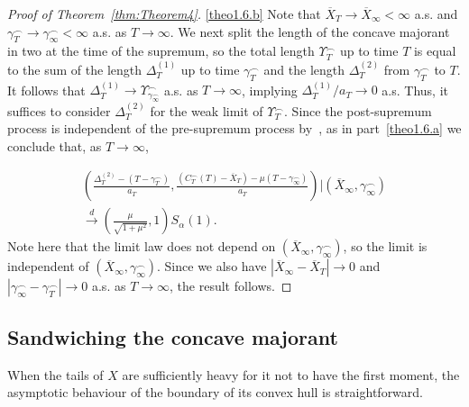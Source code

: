 \documentclass[10pt]{amsart}
\theoremstyle{definition}\newtheorem{defi}[theo]{Definition}\newtheorem{rema}[theo]{Remark}\newtheorem{exam}[theo]{Example}\newtheorem{exem}[theo]{Example}\newtheorem{nota}[theo]{Notation}
\newcommand\1{\mathds{1}}
\newcommand\cid{\xrightarrow{d}}
\newcommand\ov[1]{\overline{#1}}
\begin{document}
\begin{proof}[Proof of Theorem~\ref{thm:Theorem4}]
\eqref{theo1.6.b} Note that $\ov{X}_T\to\ov{X}_\infty <\infty$ a.s. and $\gamma_T^\frown\to\gamma_\infty^\frown<\infty$ a.s. as $T\to\infty$. We next split the length of the concave majorant in two at the time of the supremum, so the total length $\Upsilon_T^\frown$ up to time $T$ is equal to the sum of the length $\Delta_T^{(1)}$ up to time $\gamma_T^\frown$ and the length $\Delta_T^{(2)}$ from $\gamma_T^\frown$ to $T$. It follows that $\Delta_T^{(1)}\to\Upsilon_{\gamma_\infty^\frown}^\frown$ a.s. as $T\to\infty$, implying $\Delta_T^{(1)}/a_T\to 0$ a.s. Thus, it suffices to consider $\Delta_T^{(2)}$ for the weak limit of $\Upsilon_T^\frown$. Since the post-supremum process is independent of the pre-supremum process by~\cite[Theorem~2.3]{BertoinSplittingSup}, as in part~\eqref{theo1.6.a} we conclude that, as $T\to\infty$,

\begin{multline*}
\left(\frac{\Delta_T^{(2)} -\left(T-\gamma_T^\frown\right)}{a_T},
\frac{\left(C_T^\frown(T)-\ov{X}_T\right) -\mu\left(T-\gamma_\infty^\frown\right)}{a_T}\right)\bigg| \left(\ov{X}_\infty,\gamma_\infty^\frown\right)\\
\cid\left(\frac{\mu}{\sqrt{1+\mu^2}},1\right)S_\alpha(1).
\end{multline*}
Note here that the limit law does not depend on $(\ov{X}_\infty,\gamma_\infty^\frown)$, so the limit is independent of $(\ov{X}_\infty,\gamma_\infty^\frown)$. Since we also have $|\ov X_\infty-\ov X_T|\to 0$ and $|\gamma_\infty^\frown-\gamma_T^\frown|\to 0$ a.s. as $T\to\infty$, the result follows.
\end{proof}


\subsection{Sandwiching the concave majorant}\label{subsec:proof_alpha_less_than_1}
When the tails of $X$ are sufficiently heavy for it not to have the first moment, the asymptotic behaviour of the boundary of its convex hull is straightforward.
\end{document}
